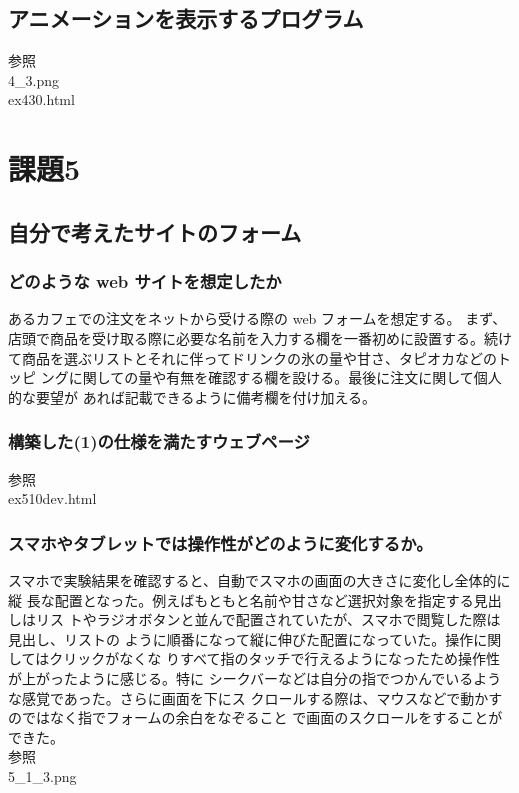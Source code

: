 \documentclass[a4j]{jarticle}
\begin{document}
    \subsection{アニメーションを表示するプログラム}
      参照\\
      4\_3.png\\
      ex430.html
  \section{課題5}
    \subsection{自分で考えたサイトのフォーム}
      \subsubsection{どのような web サイトを想定したか}
        あるカフェでの注文をネットから受ける際の web フォームを想定する。
        まず、店頭で商品を受け取る際に必要な名前を入力する欄を一番初めに設置する。続け
        て商品を選ぶリストとそれに伴ってドリンクの氷の量や甘さ、タピオカなどのトッピ
        ングに関しての量や有無を確認する欄を設ける。最後に注文に関して個人的な要望が
        あれば記載できるように備考欄を付け加える。
      \subsubsection{構築した(1)の仕様を満たすウェブページ}
        参照\\
        ex510dev.html
      \subsubsection{スマホやタブレットでは操作性がどのように変化するか。}
        スマホで実験結果を確認すると、自動でスマホの画面の大きさに変化し全体的に縦
        長な配置となった。例えばもともと名前や甘さなど選択対象を指定する見出しはリス
        トやラジオボタンと並んで配置されていたが、スマホで閲覧した際は見出し、リストの
        ように順番になって縦に伸びた配置になっていた。操作に関してはクリックがなくな
        りすべて指のタッチで行えるようになったため操作性が上がったように感じる。特に
        シークバーなどは自分の指でつかんでいるような感覚であった。さらに画面を下にス
        クロールする際は、マウスなどで動かすのではなく指でフォームの余白をなぞること
        で画面のスクロールをすることができた。\\
        参照\\
        5\_1\_3.png
\end{document}
